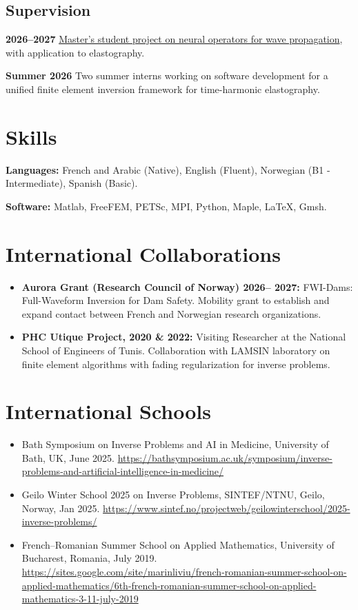 \documentclass[10pt]{article}
\begin{document}
\subsection{Supervision}

\textbf{2026--2027} \quad \href{https://www.mn.uio.no/ifi/studier/masteroppgaver/dsb/neural-operators-for-simulation-of-wave-propagatio.html}{Master's student project on neural operators for wave propagation}, with application to elastography.

\medskip

\textbf{Summer 2026} \quad Two summer interns working on software development for a unified finite element inversion framework for time-harmonic elastography.

\section{Skills}
\textbf{Languages:} French and Arabic (Native), English (Fluent), Norwegian (B1 - Intermediate), Spanish (Basic).

\textbf{Software:} Matlab, FreeFEM, PETSc, MPI, Python, Maple, LaTeX, Gmsh.  

\section*{International Collaborations}
\begin{itemize}
\item \textbf{Aurora Grant (Research Council of Norway) 2026-- 2027:} FWI-Dams: Full-Waveform Inversion for Dam Safety. Mobility grant to establish and expand contact between French and Norwegian research organizations.  

\item \textbf{PHC Utique Project, 2020 \& 2022:} Visiting Researcher at the National School of Engineers of Tunis. Collaboration with LAMSIN laboratory on finite element algorithms with fading regularization for inverse problems.  
\end{itemize}

\section*{International Schools}
\begin{itemize}
  \item Bath Symposium on Inverse Problems and AI in Medicine, University of Bath, UK, June 2025. \url{https://bathsymposium.ac.uk/symposium/inverse-problems-and-artificial-intelligence-in-medicine/}
  \item Geilo Winter School 2025 on Inverse Problems, SINTEF/NTNU, Geilo, Norway, Jan 2025. \url{https://www.sintef.no/projectweb/geilowinterschool/2025-inverse-problems/}
  \item French--Romanian Summer School on Applied Mathematics, University of Bucharest, Romania, July 2019. \url{https://sites.google.com/site/marinliviu/french-romanian-summer-school-on-applied-mathematics/6th-french-romanian-summer-school-on-applied-mathematics-3-11-july-2019}
\end{itemize}
\end{document}
